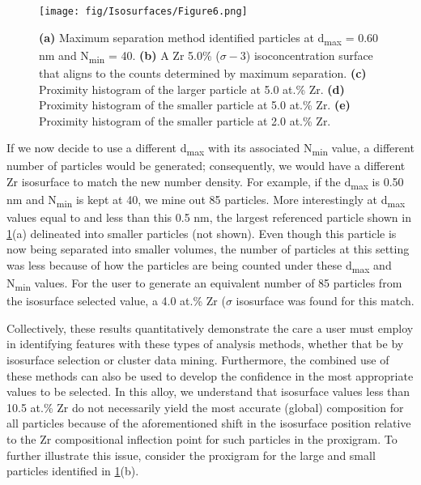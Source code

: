 		\begin{figure}
			\centering
			\texttt{[image: fig/Isosurfaces/Figure6.png]}
			\caption[Maximum separation and isoconcentration methods.]{\textbf{(a)} Maximum separation method identified particles at d\textsubscript{max} = 0.60 nm and N\textsubscript{min} = 40. \textbf{(b)} A Zr 5.0\% ($\sigma-3${}) isoconcentration surface that aligns to the counts
				determined by maximum separation. \textbf{(c)} Proximity histogram of the larger particle at 5.0 at.\% Zr. \textbf{(d)} Proximity histogram of the smaller particle at 5.0 at.\% Zr. \textbf{(e)} Proximity histogram of the smaller particle at 2.0 at.\% Zr.}
			\label{fig:Iso6}
		\end{figure}
		
		If we now decide to use a different d\textsubscript{max} with its associated N\textsubscript{min} value, a different number of particles would be generated; consequently, we would have a different Zr isosurface to match the new number density. For example, if the d\textsubscript{max} is 0.50 nm and N\textsubscript{min} is kept at 40, we mine out 85 particles. More interestingly at d\textsubscript{max} values equal to and less than this 0.5 nm, the largest referenced particle shown in \ref{fig:Iso6}(a) delineated into smaller particles (not shown). Even though this particle is now being separated into smaller volumes, the number of particles at this setting was less because of how the particles are being counted under these d\textsubscript{max} and N\textsubscript{min} values. For the user to generate an equivalent number of 85 particles from the isosurface selected value, a 4.0 at.\% Zr ($\sigma${} isosurface was found for this match. 
		
		Collectively, these results quantitatively demonstrate the care a user must employ in identifying features with these types of analysis methods, whether that be by isosurface selection or cluster data mining. Furthermore, the combined use of these methods can also be used to develop the confidence in the most appropriate values to be selected. In this alloy, we understand that isosurface values less than 10.5 at.\% Zr do not necessarily yield the most accurate (global) composition for all particles because of the aforementioned shift in the isosurface position relative to the Zr compositional inflection point for such particles in the proxigram. To further illustrate this issue, consider the proxigram for the large and small particles identified in \ref{fig:Iso6}(b).
		 
